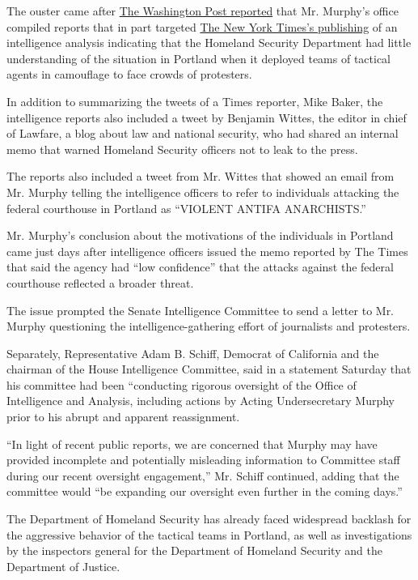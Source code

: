 The ouster came after
\href{https://www.washingtonpost.com/national-security/dhs-compiled-intelligence-reports-on-journalists-who-published-leaked-documents/2020/07/30/5be5ec9e-d25b-11ea-9038-af089b63ac21_story.html}{The
Washington Post reported} that Mr. Murphy's office compiled reports that
in part targeted
\href{https://www.nytimes3xbfgragh.onion/2020/07/28/us/federal-agents-portland-seattle-protests.html}{The
New York Times's publishing} of an intelligence analysis indicating that
the Homeland Security Department had little understanding of the
situation in Portland when it deployed teams of tactical agents in
camouflage to face crowds of protesters.

In addition to summarizing the tweets of a Times reporter, Mike Baker,
the intelligence reports also included a tweet by Benjamin Wittes, the
editor in chief of Lawfare, a blog about law and national security, who
had shared an internal memo that warned Homeland Security officers not
to leak to the press.

The reports also included a tweet from Mr. Wittes that showed an email
from Mr. Murphy telling the intelligence officers to refer to
individuals attacking the federal courthouse in Portland as ``VIOLENT
ANTIFA ANARCHISTS.''

Mr. Murphy's conclusion about the motivations of the individuals in
Portland came just days after intelligence officers issued the memo
reported by The Times that said the agency had ``low confidence'' that
the attacks against the federal courthouse reflected a broader threat.

The issue prompted the Senate Intelligence Committee to send a letter to
Mr. Murphy questioning the intelligence-gathering effort of journalists
and protesters.

Separately, Representative Adam B. Schiff, Democrat of California and
the chairman of the House Intelligence Committee, said in a statement
Saturday that his committee had been ``conducting rigorous oversight of
the Office of Intelligence and Analysis, including actions by Acting
Undersecretary Murphy prior to his abrupt and apparent reassignment.

``In light of recent public reports, we are concerned that Murphy may
have provided incomplete and potentially misleading information to
Committee staff during our recent oversight engagement,'' Mr. Schiff
continued, adding that the committee would ``be expanding our oversight
even further in the coming days.''

The Department of Homeland Security has already faced widespread
backlash for the aggressive behavior of the tactical teams in Portland,
as well as investigations by the inspectors general for the Department
of Homeland Security and the Department of Justice.


